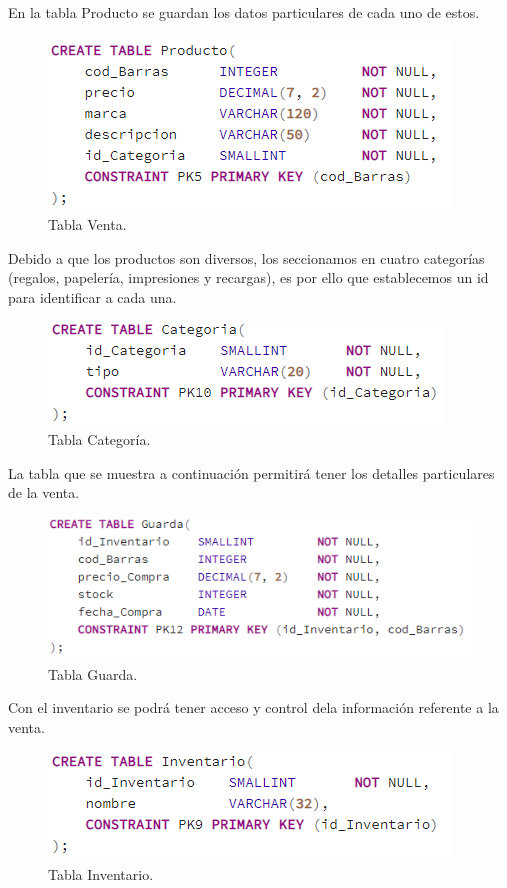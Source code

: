 \documentclass[12pt,letterpaper]{article}
\begin{document}
	En la tabla Producto se guardan los datos particulares de cada uno de estos.	
	\begin{figure}[H]
		\centering
		\includegraphics[scale=0.90]{Documentacion/img/tablaProducto.PNG}
		\caption{Tabla Venta.}
	\end{figure}
	Debido a que los productos son diversos, los seccionamos en cuatro categorías (regalos, papelería, impresiones y recargas), es por ello que establecemos un id para identificar a cada una. 	
	\begin{figure}[H]
		\centering
		\includegraphics[scale=0.90]{Documentacion/img/tablaCategoria.PNG}
		\caption{Tabla Categoría.}
	\end{figure}
	La tabla que se muestra a continuación permitirá tener los detalles particulares de la venta. 	
	\begin{figure}[H]
		\centering
		\includegraphics[scale=0.90]{Documentacion/img/tablaGuarda.PNG}
		\caption{Tabla Guarda.}
	\end{figure}
	Con el inventario se podrá tener acceso y control dela información referente a la venta. 	
	\begin{figure}[H]
		\centering
		\includegraphics[scale=0.90]{Documentacion/img/tablaInventario.PNG}
		\caption{Tabla Inventario.}
	\end{figure}
\end{document}
